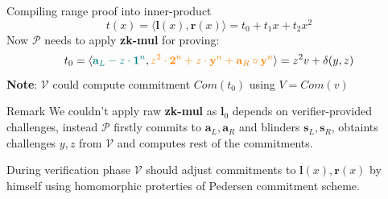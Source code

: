 \documentclass{zkdl-presentation-template}
\begin{document}
\begin{frame}{Compiling range proof into inner-product}
    $$t(x) = \langle \mathbf{l}(x), \mathbf{r}(x) \rangle = t_0 + t_1 x + t_2 x^2$$
    Now $\mathcal{P}$ needs to apply \textbf{zk-mul} for proving: $$t_0 =  \langle \textcolor{teal}{\mathbf{a}_L - z \cdot \mathbf{1}^n}, \textcolor{orange}{z^2 \cdot \mathbf{2}^n + z \cdot \mathbf{y}^n + \mathbf{a}_R \circ \mathbf{y}^n}\rangle = z^2v + \delta(y,z)$$ 
    \textbf{Note}: $\mathcal{V}$ could compute commitment $Com(t_0)$ using $V=Com(v)$
    \begin{alertblock}{Remark}
    We couldn't apply raw \textbf{zk-mul} as $\mathbf{l}_0$ depends on verifier-provided challenges, instead $\mathcal{P}$ firstly commits to $\mathbf{a}_L, \mathbf{a}_R$ and blinders $\mathbf{s}_L, \mathbf{s}_R$, obtaints challenges $y,z$ from $\mathcal{V}$ and computes rest of the commitments. 
    
    During verification phase $\mathcal{V}$ should adjust commitments to $\mathbf{l}(x), \mathbf{r}(x)$ by himself using homomorphic proterties of Pedersen commitment scheme.
    \end{alertblock}
\end{frame}
\end{document}
